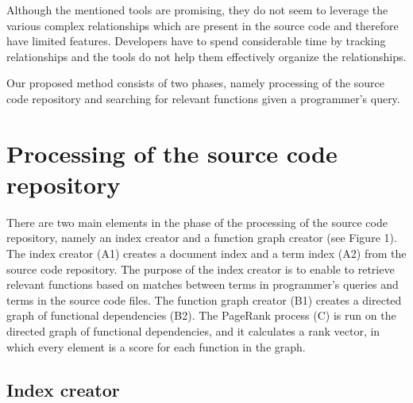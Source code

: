 \documentclass{llncs}
\begin{document}
Although the mentioned tools are promising, they do not seem to leverage the various
complex relationships which are present in the source code and therefore have
limited features. Developers have to spend considerable time by tracking relationships
and the tools do not help them effectively organize the relationships.

Our proposed method consists of two phases, namely processing of the source code
repository and searching for relevant functions given a programmer’s query.
 
\section {Processing of the source code repository}

There are two main elements in the phase of the processing of the source code repository,
namely an index creator and a function graph creator (see Figure 1). The index
creator (A1) creates a document index and a term index (A2) from the source code
repository. The purpose of the index creator is to enable to retrieve relevant functions
based on matches between terms in programmer’s queries and terms in the source
code files. The function graph creator (B1) creates a directed graph of functional dependencies
(B2). The PageRank process (C) is run on the directed graph of functional
dependencies, and it calculates a rank vector, in which every element is a score for
each function in the graph.
\subsection{Index creator}
\end{document}
